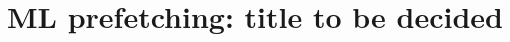 \documentclass[sigplan, screen,10pt]{acmart}
\begin{document}
\sloppy
\title{ML prefetching: title to be decided}




 


 

\renewcommand{\shortauthors}{Patel, et al.}

\begin{abstract}

\end{abstract}

\end{document}
